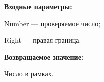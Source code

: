 \textbf{Входные параметры:}  
 
Number --- проверяемое число;
 
Right --- правая граница.

\textbf{Возвращаемое значение:}
 
Число в рамках.